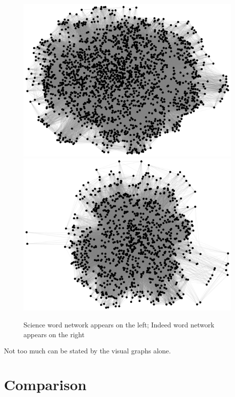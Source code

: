 \documentclass[12pt]{article}
\begin{document}
\begin{figure}[H]
	\centering
	\includegraphics[scale=0.4]{Images/Sci.png}
	\includegraphics[scale=0.4]{Images/Ind.png}
	\caption{Science word network appears on the left; Indeed word network appears on the right}
\end{figure}
\noindent Not too much can be stated by the visual graphs alone. 

\section{Comparison}
\end{document}
